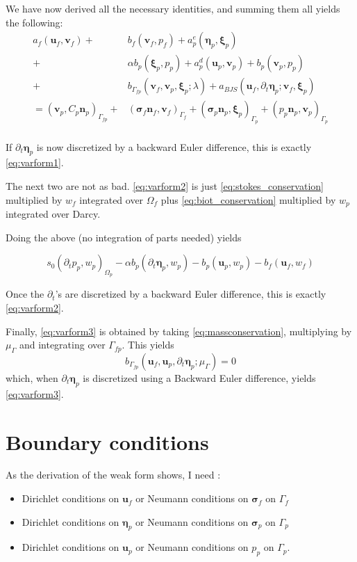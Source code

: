 \documentclass{article}
\newcommand{\mathspace}[1]{\ensuremath{#1}\xspace} %
\newcommand{\sigmabf}{\mathspace{\boldsymbol{\sigma}}}
\newcommand{\inner}[2]{\mathspace{\left (#1, #2 \right)}}
\newcommand{\ddt}[1]{\mathspace{\partial_t #1}}
\newcommand{\stokes}{\mathspace{\Omega_{f}}}
\newcommand{\stokesbdy}{\mathspace{\Gamma_{f}}}
\newcommand{\darcy}{\mathspace{\Omega_{p}}}
\newcommand{\darcybdy}{\mathspace{\Gamma_{p}}}
\newcommand{\interface}{\mathspace{\Gamma_{fp}}}
\newcommand{\nf}{\mathspace{\mathbf{n}_f}}
\newcommand{\np}{\mathspace{\mathbf{n}_p}}
\newcommand{\uf}{\mathspace{\mathbf{u}_f}}
\newcommand{\vf}{\mathspace{\mathbf{v}_f}}
\newcommand{\up}{\mathspace{\mathbf{u}_p}}
\newcommand{\vp}{\mathspace{\mathbf{v}_p}}
\newcommand{\pf}{\mathspace{p_f}}
\newcommand{\pp}{\mathspace{p_p}}
\newcommand{\wf}{\mathspace{w_f}}
\renewcommand{\wp}{\mathspace{w_p}}
\newcommand{\disp}{\mathspace{\boldsymbol{\eta}_p}}
\newcommand{\disptest}{\mathspace{\boldsymbol{\xi}_p}}
\newcommand{\multtest}{\mathspace{\mu_{\Gamma}}}
\begin{document}
We have now derived all the necessary identities, and summing them all yields the following:
\begin{align*}
  a_f(\uf, \vf) +& b_f(\vf, \pf)  + a^e_p(\disp, \disptest)  \\ +&\alpha b_p(\disptest, \pp)  + a_p^d(\up, \vp) + b_p(\vp, \pp)  \\
  + &b_{\interface}\left (\vf, \vp, \disptest; \lambda \right ) + a_{BJS}\left (\uf, \ddt{\disp}; \vf, \disptest \right)\\
      = \inner{\vp}{C_p\np}_{\interface} +& (\sigmabf_f\nf, \vf)_{\stokesbdy} + (\sigmabf_p\np, \disptest)_{\darcybdy} + (\pp\np, \vp)_{\darcybdy}\\
\end{align*}

If \ddt{\disp} is now discretized by a backward Euler difference, this is exactly \eqref{eq:varform1}.

The next two are not as bad. \eqref{eq:varform2} is just \eqref{eq:stokes_conservation} multiplied by \wf integrated over \stokes plus \eqref{eq:biot_conservation} multiplied by \wp integrated over Darcy.

Doing the above (no integration of parts needed) yields

$$s_0\inner{\ddt{\pp}}{\wp}_{\darcy} - \alpha b_p(\ddt{\disp}, \wp)
- b_p(\up, \wp) - b_f(\uf, \wf)$$ 

Once the \ddt{}'s are discretized by a backward Euler difference, this is exactly \eqref{eq:varform2}.

Finally, \eqref{eq:varform3} is obtained by taking \eqref{eq:massconservation}, multiplying by \multtest and integrating over \interface. This yields $$b_{\interface} (\uf, \up, \ddt{\disp} ;\multtest) = 0$$
which, when \ddt{\disp} is discretized using a Backward Euler difference, yields \eqref{eq:varform3}.




\section{Boundary conditions}
As the derivation of the weak form shows, I need :
\begin{itemize}
\item Dirichlet conditions on \uf or Neumann conditions on
  $\sigmabf_f$ on \stokesbdy
\item Dirichlet conditions on \disp or Neumann %
  conditions on $\sigmabf_p$ on \darcybdy
\item Dirichlet conditions on
  \up or Neumann conditions on \pp on \darcybdy.
\end{itemize}
\end{document}
